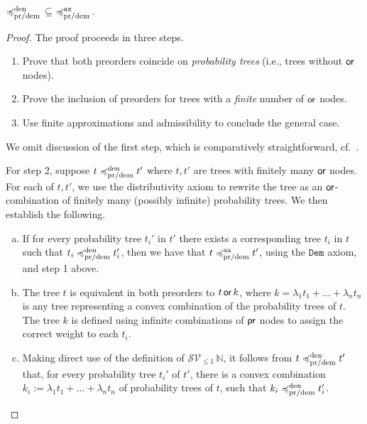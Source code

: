 \begin{lemma}
\label{lemma:completeness}
${\preccurlyeq^{\text{den}}_{\text{pr/dem}}} \, \subseteq \, \, \preccurlyeq^{\text{ax}}_{\text{pr/dem}}\,$.
\end{lemma}
\begin{proof}
The proof proceeds in three steps.
    \begin{enumerate}
        \item Prove that both preorders coincide 
            on \emph{probability trees} (i.e., trees without $\operatorname{\textsf{or}}$ nodes).
        \item Prove the inclusion of preorders for
             trees with a \emph{finite} number 
            of $\operatorname{\textsf{or}}$ nodes.
        \item Use finite approximations and admissibility
            to conclude the general case.
    \end{enumerate}

We omit discussion of the first step, which  is comparatively straightforward, cf.~\cite{heckmann}.

For step 2, suppose $t \preccurlyeq^{\text{den}}_{\text{pr/dem}} t'$ where $t,t'$ are 
trees with finitely many $\operatorname{\textsf{or}}$ nodes. For each of $t, t'$, we use the distributivity axiom to rewrite the tree
          as an $\operatorname{\textsf{or}}$-combination of finitely many (possibly infinite) {probability trees}. We then establish the following.
    \begin{enumerate}[(a)]
         \item 
            If for every 
            probability
            tree $t_i'$ in $t'$ there exists 
            a corresponding tree $t_i$ in $t$ 
            such that $t_i \preccurlyeq^{\text{den}}_{\text{pr/dem}} t_i'$,
            then we have that $t \preccurlyeq^{\text{ax}}_{\text{pr/dem}} t'$, using the $\texttt{Dem}$ axiom, and  step 1 above.

        \item 
            The tree $t$ is equivalent  in both preorders  to 
            $t \operatorname{\textsf{or}} k$, where $k = \lambda_1t_1+ \dots + \lambda_n t_n$
            is any tree representing a convex combination of the probability trees of $t$.
            The tree $k$ is defined  using infinite combinations of $\operatorname{\textsf{pr}}$ nodes to assign the correct weight to each $t_i$.
    
        \item Making direct use of the definition of $\mathcal{S}\mathcal{V}_{\leq 1}\, \mathbb{N}$, it follows from $t \preccurlyeq^{\text{den}}_{\text{pr/dem}} t'$ that, for every
            probability tree   $t_i'$ of $t'$,
            there is a convex combination
            $k_i := \lambda_1t_1+ \dots + \lambda_n t_n$
            of probability trees of $t$,
                        such that $k_i \preccurlyeq^{\text{den}}_{\text{pr/dem}} t_i'$.



\end{enumerate}
\end{proof}
